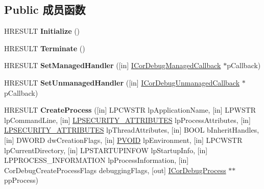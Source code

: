 \subsection*{Public 成员函数}
\begin{DoxyCompactItemize}
\item 
\mbox{\label{interface_i_cor_debug_a8c6a01904bd733953a6501e999b1933e}} 
H\+R\+E\+S\+U\+LT {\bfseries Initialize} ()
\item 
\mbox{\label{interface_i_cor_debug_a1070ba7b78a2ad4dd3530c469d412850}} 
H\+R\+E\+S\+U\+LT {\bfseries Terminate} ()
\item 
\mbox{\label{interface_i_cor_debug_a4cbbe139cb3a55f1dfc578c17223d486}} 
H\+R\+E\+S\+U\+LT {\bfseries Set\+Managed\+Handler} (\mbox{[}in\mbox{]} \hyperlink{interface_i_cor_debug_managed_callback}{I\+Cor\+Debug\+Managed\+Callback} $\ast$p\+Callback)
\item 
\mbox{\label{interface_i_cor_debug_aef79325366e34f9f61aa4a4a895d21f0}} 
H\+R\+E\+S\+U\+LT {\bfseries Set\+Unmanaged\+Handler} (\mbox{[}in\mbox{]} \hyperlink{interface_i_cor_debug_unmanaged_callback}{I\+Cor\+Debug\+Unmanaged\+Callback} $\ast$p\+Callback)
\item 
\mbox{\label{interface_i_cor_debug_a711d674a2a228a268b289ba7c55fb244}} 
H\+R\+E\+S\+U\+LT {\bfseries Create\+Process} (\mbox{[}in\mbox{]} L\+P\+C\+W\+S\+TR lp\+Application\+Name, \mbox{[}in\mbox{]} L\+P\+W\+S\+TR lp\+Command\+Line, \mbox{[}in\mbox{]} \hyperlink{struct___s_e_c_u_r_i_t_y___a_t_t_r_i_b_u_t_e_s}{L\+P\+S\+E\+C\+U\+R\+I\+T\+Y\+\_\+\+A\+T\+T\+R\+I\+B\+U\+T\+ES} lp\+Process\+Attributes, \mbox{[}in\mbox{]} \hyperlink{struct___s_e_c_u_r_i_t_y___a_t_t_r_i_b_u_t_e_s}{L\+P\+S\+E\+C\+U\+R\+I\+T\+Y\+\_\+\+A\+T\+T\+R\+I\+B\+U\+T\+ES} lp\+Thread\+Attributes, \mbox{[}in\mbox{]} B\+O\+OL b\+Inherit\+Handles, \mbox{[}in\mbox{]} D\+W\+O\+RD dw\+Creation\+Flags, \mbox{[}in\mbox{]} \hyperlink{interfacevoid}{P\+V\+O\+ID} lp\+Environment, \mbox{[}in\mbox{]} L\+P\+C\+W\+S\+TR lp\+Current\+Directory, \mbox{[}in\mbox{]} L\+P\+S\+T\+A\+R\+T\+U\+P\+I\+N\+F\+OW lp\+Startup\+Info, \mbox{[}in\mbox{]} L\+P\+P\+R\+O\+C\+E\+S\+S\+\_\+\+I\+N\+F\+O\+R\+M\+A\+T\+I\+ON lp\+Process\+Information, \mbox{[}in\mbox{]} Cor\+Debug\+Create\+Process\+Flags debugging\+Flags, \mbox{[}out\mbox{]} \hyperlink{interface_i_cor_debug_process}{I\+Cor\+Debug\+Process} $\ast$$\ast$pp\+Process)
$$
\end{DoxyCompactItemize}
